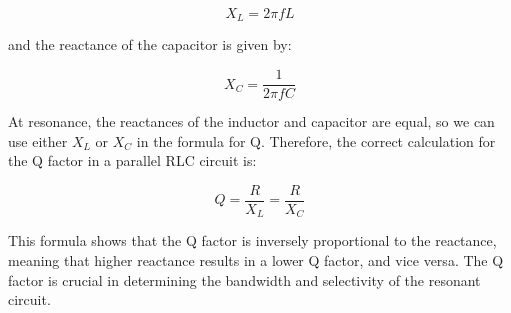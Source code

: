 \[
X_L = 2\pi f L
\]

and the reactance of the capacitor is given by:

\[
X_C = \frac{1}{2\pi f C}
\]

At resonance, the reactances of the inductor and capacitor are equal, so we can use either \( X_L \) or \( X_C \) in the formula for Q. Therefore, the correct calculation for the Q factor in a parallel RLC circuit is:

\[
Q = \frac{R}{X_L} = \frac{R}{X_C}
\]

This formula shows that the Q factor is inversely proportional to the reactance, meaning that higher reactance results in a lower Q factor, and vice versa. The Q factor is crucial in determining the bandwidth and selectivity of the resonant circuit.

